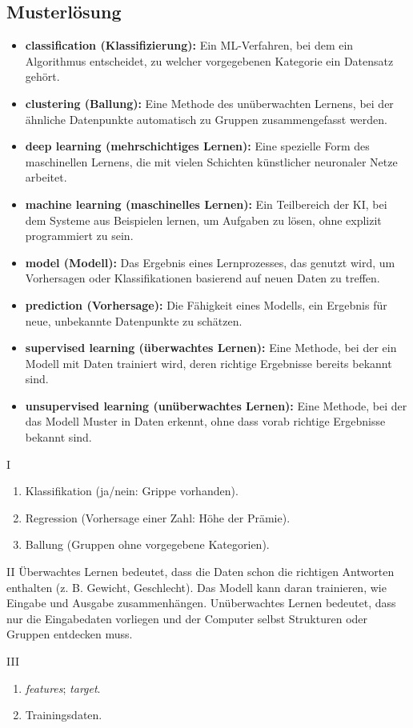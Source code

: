 \subsection*{Musterlösung}

\begin{itemize}
  \item \textbf{classification (Klassifizierung):} Ein ML-Verfahren, bei dem ein Algorithmus entscheidet, zu welcher vorgegebenen Kategorie ein Datensatz gehört.
  \item \textbf{clustering (Ballung):} Eine Methode des unüberwachten Lernens, bei der ähnliche Datenpunkte automatisch zu Gruppen zusammengefasst werden.
  \item \textbf{deep learning (mehrschichtiges Lernen):} Eine spezielle Form des maschinellen Lernens, die mit vielen Schichten künstlicher neuronaler Netze arbeitet.
  \item \textbf{machine learning (maschinelles Lernen):} Ein Teilbereich der KI, bei dem Systeme aus Beispielen lernen, um Aufgaben zu lösen, ohne explizit programmiert zu sein.
  \item \textbf{model (Modell):} Das Ergebnis eines Lernprozesses, das genutzt wird, um Vorhersagen oder Klassifikationen basierend auf neuen Daten zu treffen.
  \item \textbf{prediction (Vorhersage):} Die Fähigkeit eines Modells, ein Ergebnis für neue, unbekannte Datenpunkte zu schätzen.
  \item \textbf{supervised learning (überwachtes Lernen):} Eine Methode, bei der ein Modell mit Daten trainiert wird, deren richtige Ergebnisse bereits bekannt sind.
  \item \textbf{unsupervised learning (unüberwachtes Lernen):} Eine Methode, bei der das Modell Muster in Daten erkennt, ohne dass vorab richtige Ergebnisse bekannt sind.
\end{itemize}

\begin{aufgabe}{I}
\begin{enumerate}
  \item Klassifikation (ja/nein: Grippe vorhanden).  
  \item Regression (Vorhersage einer Zahl: Höhe der Prämie).  
  \item Ballung (Gruppen ohne vorgegebene Kategorien).  
\end{enumerate}
\end{aufgabe}

\begin{aufgabe}{II}
Überwachtes Lernen bedeutet, dass die Daten schon die richtigen Antworten enthalten (z. B. Gewicht, Geschlecht). Das Modell kann daran trainieren, wie Eingabe und Ausgabe zusammenhängen.  
Unüberwachtes Lernen bedeutet, dass nur die Eingabedaten vorliegen und der Computer selbst Strukturen oder Gruppen entdecken muss.  
\end{aufgabe}

\begin{aufgabe}{III}
\begin{enumerate}
  \item \textit{features}; \textit{target}.  
  \item Trainingsdaten.  
\end{enumerate}
\end{aufgabe}